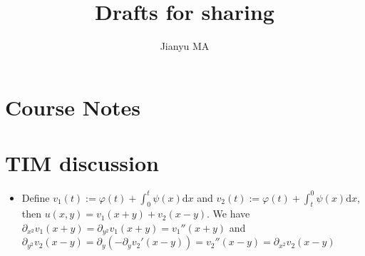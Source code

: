 \documentclass[]{article}
\title{Drafts for sharing}
\author{Jianyu MA}
\theoremstyle{remark}
\begin{document}
\maketitle


\section{Course Notes}
\section{TIM discussion}
\begin{itemize}
	\item Define $ v_1(t) :=\varphi(t) + \int_0^{t} \psi(x) \mathrm{d} x
	$ and $ v_2(t) :=\varphi(t) + \int_{t}^{0} \psi(x) \mathrm{d} x
	$, then $ u(x,y) = v_1(x+y) + v_2(x-y) $. We have $ \partial_{x^2}{v_1(x+y)} = \partial_{y^2}{v_1(x+y)} = v_1''(x+y)$ and $ \partial_{y^2}{v_2(x-y)} = \partial_{y}(-\partial_{y}v_2'(x-y))=v_2''(x-y)= \partial_{x^2}{v_2(x-y)}$
\end{itemize}
\end{document}
